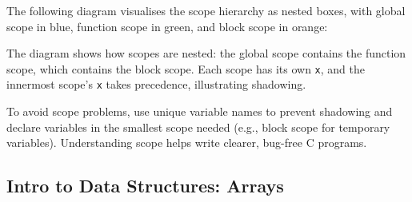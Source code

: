 \documentclass[a4paper,12pt]{article}
\begin{document}
The following diagram visualises the scope hierarchy as nested boxes, with global scope in blue, function scope in green, and block scope in orange:

\begin{center}
\end{center}


The diagram shows how scopes are nested: the global scope contains the function scope, which contains the block scope. Each scope has its own \texttt{x}, and the innermost scope's \texttt{x} takes precedence, illustrating shadowing.

To avoid scope problems, use unique variable names to prevent shadowing and declare variables in the smallest scope needed (e.g., block scope for temporary variables). Understanding scope helps write clearer, bug-free C programs.

\hrulefill

\newpage

\subsection{Intro to Data Structures: Arrays}
\end{document}
